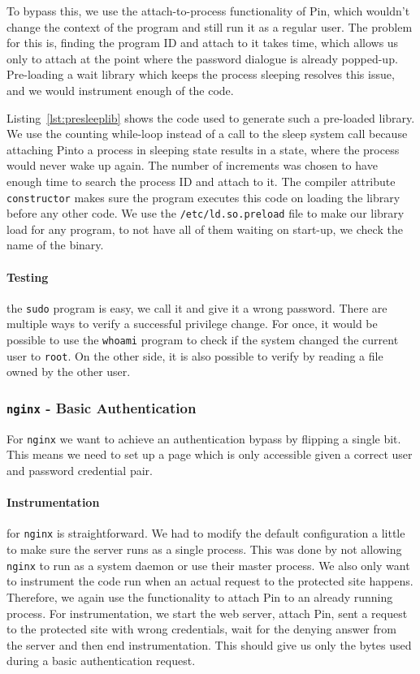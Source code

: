 To bypass this, we use the attach-to-process functionality of Pin, which
wouldn't change the context of the program and still run it as a regular user.
The problem for this is, finding the program ID and attach to it takes time,
which allows us only to attach at the point where the password dialogue is
already popped-up. Pre-loading a wait library which keeps the process sleeping
resolves this issue, and we would instrument enough of the code.

Listing~\ref{lst:presleeplib} shows the code used to generate such a pre-loaded
library. We use the counting while-loop instead of a call to the sleep system
call because attaching Pinto a process in sleeping state results in a state,
where the process would never wake up again. The number of increments was chosen
to have enough time to search the process ID and attach to it. The compiler
attribute \texttt{constructor} makes sure the program executes this code on
loading the library before any other code. We use the
\texttt{/etc/ld.so.preload} file to make our library load for any program, to
not have all of them waiting on start-up, we check the name of the binary.

\paragraph{Testing} the \texttt{sudo} program is easy, we call it and give it a
wrong password. There are multiple ways to verify a successful privilege change.
For once, it would be possible to use the \texttt{whoami} program to check if
the system changed the current user to \texttt{root}. On the other side, it is
also possible to verify by reading a file owned by the other user.

\subsubsection{\texttt{nginx} - Basic Authentication}

For \texttt{nginx} we want to achieve an authentication bypass by flipping a
single bit. This means we need to set up a page which is only accessible given a
correct user and password credential pair.

\paragraph{Instrumentation} for \texttt{nginx} is straightforward. We had to
modify the default configuration a little to make sure the server runs as a
single process. This was done by not allowing \texttt{nginx} to run as a system
daemon or use their master process. We also only want to instrument the code run
when an actual request to the protected site happens. Therefore, we again use
the functionality to attach Pin to an already running process. For
instrumentation, we start the web server, attach Pin, sent a request to the
protected site with wrong credentials, wait for the denying answer from the
server and then end instrumentation. This should give us only the bytes used
during a basic authentication request.


